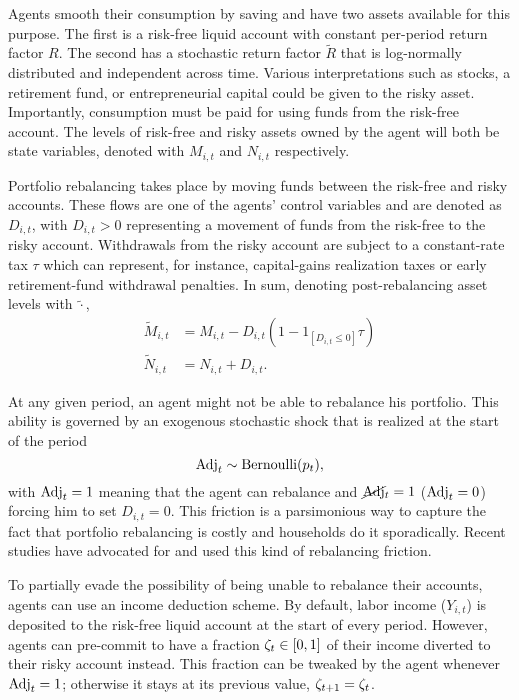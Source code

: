 \documentclass[./RiskyContrib.tex]{subfiles}
\begin{document}
Agents smooth their consumption by saving and have two assets
available for this purpose. The first is a risk-free liquid account with 
constant per-period return factor $R$. The second has a stochastic return
factor $\tilde{R}$ that is log-normally distributed and independent across
time. Various interpretations such as stocks, a retirement fund, or entrepreneurial
capital could be given to the risky asset. Importantly, consumption must be paid for
using funds from the risk-free account. The levels of risk-free and risky assets
owned by the agent will both be state variables, denoted with $M_{i,t}$ and $N_{i,t}$
respectively.

Portfolio rebalancing takes place by moving funds between the risk-free
and risky accounts. These flows are one of the agents' control variables
and are denoted as $D_{i,t}$, with $D_{i,t}>0$ representing a movement of
funds from the risk-free to the risky account. Withdrawals from the risky
account are subject to a constant-rate tax $\tau$ which can represent, for
instance, capital-gains realization taxes or early retirement-fund withdrawal
penalties. In sum, denoting post-rebalancing asset levels with $\tilde{\cdot}$,
\begin{equation*}
\begin{split}
\tilde{M}_{i,t} &= M_{i,t} - D_{i,t}(1 - 1_{[D_{i,t}\leq0]}\tau)\\
\tilde{N}_{i,t} &= N_{i,t} + D_{i,t}.
\end{split}
\end{equation*}

At any given period, an agent might not be able to rebalance his portfolio.
This ability is governed by an exogenous stochastic shock that is realized
at the start of the period
\begin{equation*}
\text{Adj}_t \sim \text{Bernoulli}(p_t),
\end{equation*}
with $\text{Adj}_t=1$ meaning that the agent can rebalance and $\cancel{\text{Adj}}_t=1$ ($\text{Adj}_t = 0$)
forcing him to set $D_{i,t} = 0$. This friction is a parsimonious way to capture
the fact that portfolio rebalancing is costly and households do it sporadically.
Recent studies have advocated for \citep{Giglio2021aer} and used
\citep{Luetticke2021aej_macro} this kind of rebalancing friction.

To partially evade the possibility of being unable to rebalance their accounts, agents
can use an income deduction scheme. By default, labor income ($Y_{i,t}$) is deposited to
the risk-free liquid account at the start of every period. However, agents can pre-commit
to have a fraction  $\zeta_t\in[0,1]$ of their income diverted to their risky account instead.
This fraction can be tweaked by the agent whenever $\text{Adj}_t = 1$; otherwise it stays at its
previous value, $\zeta_{t+1} = \zeta_t$.
\end{document}
